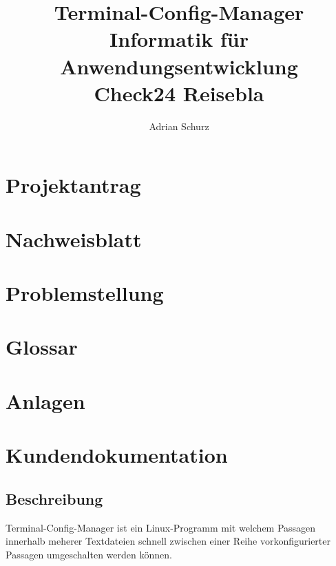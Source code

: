 \documentclass[a4paper,11pt]{scrartcl} %
\author{Adrian Schurz}
\title{Terminal-Config-Manager\\
	Informatik für Anwendungsentwicklung\\
	Check24 Reisebla\\ %
	}
\begin{document}

\maketitle
{}
\newpage

\section{Projektantrag}
\paragraph{}

\section{Nachweisblatt}
\paragraph{}

\newpage
\tableofcontents
\newpage


\section{Problemstellung}
\paragraph{}


\section{Glossar}


\section{Anlagen}

\section{Kundendokumentation}

\subsection{Beschreibung}
Terminal-Config-Manager ist ein Linux-Programm mit welchem
Passagen innerhalb meherer Textdateien schnell zwischen einer Reihe
vorkonfigurierter Passagen umgeschalten werden können.
\end{document}
